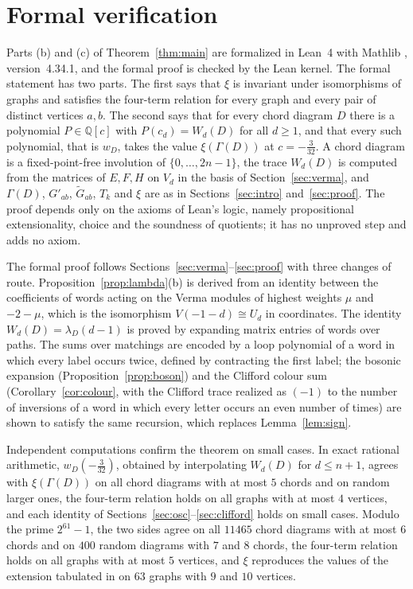 \documentclass[preprint,12pt]{elsarticle}
\theoremstyle{definition}
\newcommand{\Q}{\mathbb{Q}}
\begin{document}
\section{Formal verification}\label{sec:lean}

Parts (b) and (c) of Theorem~\ref{thm:main} are formalized in Lean~4 \cite{MU21} with Mathlib \cite{Mathlib20}, version~4.34.1, and the formal proof is checked by the Lean kernel. The formal statement has two parts. The first says that $\xi$ is invariant under isomorphisms of graphs and satisfies the four-term relation for every graph and every pair of distinct vertices $a,b$. The second says that for every chord diagram $D$ there is a polynomial $P\in\Q[c]$ with $P(c_d)=W_d(D)$ for all $d\ge1$, and that every such polynomial, that is $w_D$, takes the value $\xi(\Gamma(D))$ at $c=-\frac{3}{32}$. A chord diagram is a fixed-point-free involution of $\{0,\dots,2n-1\}$, the trace $W_d(D)$ is computed from the matrices of $E,F,H$ on $V_d$ in the basis of Section~\ref{sec:verma}, and $\Gamma(D)$, $G'_{ab}$, $\widetilde G_{ab}$, $T_k$ and $\xi$ are as in Sections~\ref{sec:intro} and~\ref{sec:proof}. The proof depends only on the axioms of Lean's logic, namely propositional extensionality, choice and the soundness of quotients; it has no unproved step and adds no axiom.

The formal proof follows Sections~\ref{sec:verma}--\ref{sec:proof} with three changes of route. Proposition~\ref{prop:lambda}(b) is derived from an identity between the coefficients of words acting on the Verma modules of highest weights $\mu$ and $-2-\mu$, which is the isomorphism $V(-1-d)\cong U_d$ in coordinates. The identity $W_d(D)=\lambda_D(d-1)$ is proved by expanding matrix entries of words over paths. The sums over matchings are encoded by a loop polynomial of a word in which every label occurs twice, defined by contracting the first label; the bosonic expansion (Proposition~\ref{prop:boson}) and the Clifford colour sum (Corollary~\ref{cor:colour}, with the Clifford trace realized as $(-1)$ to the number of inversions of a word in which every letter occurs an even number of times) are shown to satisfy the same recursion, which replaces Lemma~\ref{lem:sign}.

Independent computations confirm the theorem on small cases. In exact rational arithmetic, $w_D(-\frac{3}{32})$, obtained by interpolating $W_d(D)$ for $d\le n+1$, agrees with $\xi(\Gamma(D))$ on all chord diagrams with at most $5$ chords and on random larger ones, the four-term relation holds on all graphs with at most $4$ vertices, and each identity of Sections~\ref{sec:osc}--\ref{sec:clifford} holds on small cases. Modulo the prime $2^{61}-1$, the two sides agree on all $11465$ chord diagrams with at most $6$ chords and on $400$ random diagrams with $7$ and $8$ chords, the four-term relation holds on all graphs with at most $5$ vertices, and $\xi$ reproduces the values of the extension tabulated in \cite{FKPU} on $63$ graphs with $9$ and $10$ vertices.
\end{document}
